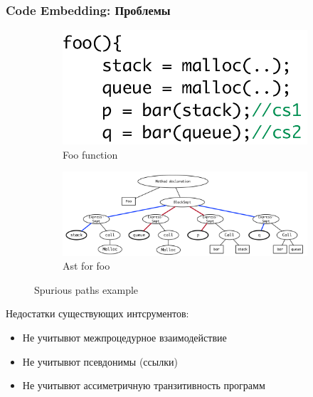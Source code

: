 \documentclass[xcolor=table,english]{beamer}
\begin{document}
\begin{frame}[fragile] \frametitle{Code Embedding: Проблемы}
    \begin{minipage}[m]{\linewidth}
        \begin{figure}
            \centering
            \begin{subfigure}[b]{0.35\textwidth}
                \includegraphics[width=\textwidth]{figures/code_for_ast.png}
                \caption{Foo function}
            \end{subfigure}
            \hfill
            \begin{subfigure}[b]{0.55\textwidth}
                \includegraphics[width=\textwidth]{figures/ast_approach.png}
                \caption{Ast for foo}
            \end{subfigure}
            \caption{Spurious paths example}
        \end{figure}
    \end{minipage}\hfill
    \begin{minipage}[m]{\linewidth}
        Недостатки существующих интсрументов:
        \begin{itemize}
            \item Не учитывют межпроцедурное взаимодействие
            \item Не учитывют псевдонимы (ссылки)
            \item Не учитывют ассиметричную транзитивность программ
        \end{itemize}
    \end{minipage}
\end{frame}
\end{document}
